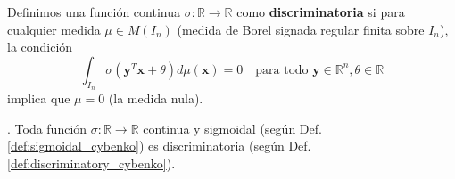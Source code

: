 \begin{definition}
\label{def:discriminatory_cybenko}
Definimos una función continua $\sigma: \mathbb{R} \to \mathbb{R}$ como \textbf{discriminatoria} \citep{Cybenko1989} si para cualquier medida $\mu \in M(I_n)$ (medida de Borel signada regular finita sobre $I_n$), la condición
\[ \int_{I_n} \sigma(\mathbf{y}^T \mathbf{x} + \theta) d\mu(\mathbf{x}) = 0 \quad \text{para todo } \mathbf{y} \in \mathbb{R}^n, \theta \in \mathbb{R} \]
implica que $\mu = 0$ (la medida nula).
\end{definition}

\begin{lemma}
\label{lem:sigmoidal_is_discriminatory}
\citep[Lemma 1]{Cybenko1989}. Toda función $\sigma: \mathbb{R} \to \mathbb{R}$ continua y sigmoidal (según Def. \ref{def:sigmoidal_cybenko}) es discriminatoria (según Def. \ref{def:discriminatory_cybenko}).
\end{lemma}

